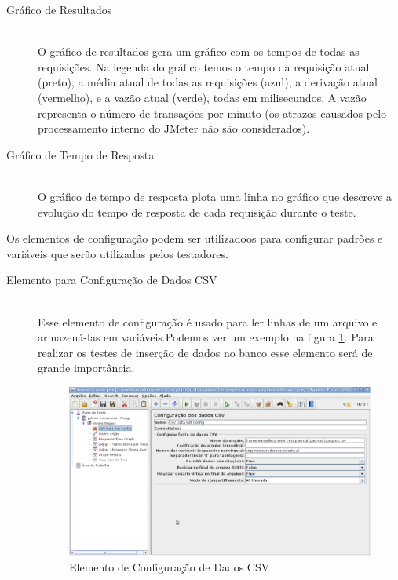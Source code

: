 \begin{description}
\item[Gráfico de Resultados] \hfill \\

O gráfico de resultados gera um gráfico com os tempos de todas as requisições. Na legenda do gráfico temos o tempo da requisição atual (preto), a média atual de todas as requisições (azul), a derivação atual (vermelho), e a vazão atual (verde), todas em milisecundos. A vazão representa o número de transações por minuto (os atrazos causados pelo processamento interno do JMeter não são considerados).

\item[Gráfico de Tempo de Resposta] \hfill \\

O gráfico de tempo de resposta plota uma linha no gráfico que descreve a evolução do tempo de resposta de cada requisição durante o teste.
\end{description}

Os elementos de configuração podem ser utilizadoos para configurar padrões e variáveis que serão utilizadas pelos testadores.

\begin{description}
\item[Elemento para Configuração de Dados CSV] \hfill \\

Esse elemento de configuração é usado para ler linhas de um arquivo e armazená-las em variáveis.Podemos ver um exemplo na figura \ref{fig:configuracao_csv}. Para realizar os testes de inserção de dados no banco esse elemento será de grande importância.

	\begin{figure}[!htbp]
		\begin{center}
			\includegraphics[width=1\textwidth]{configuracao_csv}
		\end{center}
		\caption{Elemento de Configuração de Dados CSV}
		\label{fig:configuracao_csv}
	\end{figure}
	
\end{description}














